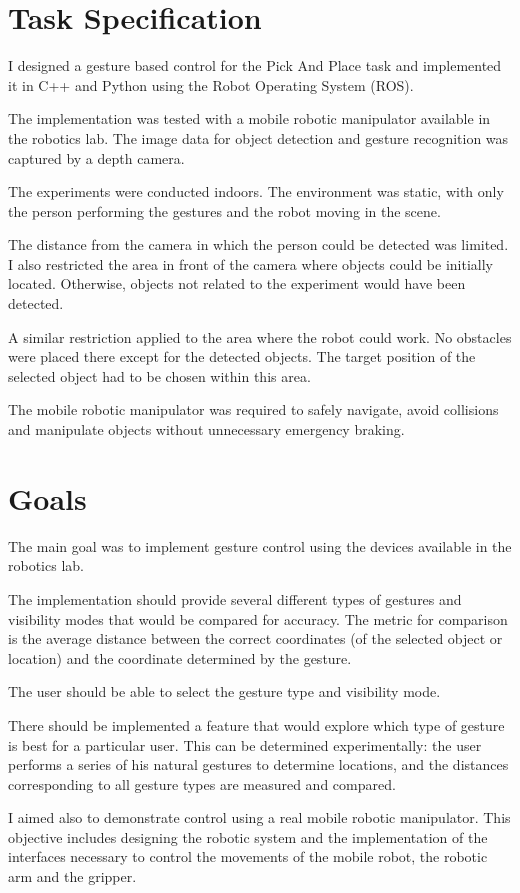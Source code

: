 \section{Task Specification}
I designed a gesture based control for the Pick And Place task and implemented it in C++ and Python using the Robot Operating System (ROS).\par
The implementation was tested with a mobile robotic manipulator available in the robotics lab. The image data for object detection and gesture recognition was captured by a depth camera.\par
The experiments were conducted indoors. The environment was static, with only the person performing the gestures and the robot moving in the scene.\par
The distance from the camera in which the person could be detected was limited. I also restricted the area in front of the camera where objects could be initially located. Otherwise, objects not related to the experiment would have been detected.\par
A similar restriction applied to the area where the robot could work. No obstacles were placed there except for the detected objects. The target position of the selected object had to be chosen within this area.\par
The mobile robotic manipulator was required to safely navigate, avoid collisions and manipulate objects without unnecessary emergency braking.\par

\section{Goals}
The main goal was to implement gesture control using the devices available in the robotics lab.\par
The implementation should provide several different types of gestures and visibility modes that would be compared for accuracy. The metric for comparison is the average distance between the correct coordinates (of the selected object or location) and the coordinate determined by the gesture.\par
The user should be able to select the gesture type and visibility mode.\par
There should be implemented a feature that would explore which type of gesture is best for a particular user. This can be determined  experimentally: the user performs a series of his natural gestures to determine locations, and the distances corresponding to all gesture types are measured and compared.\par
I aimed also to demonstrate control using a real mobile robotic manipulator. This objective includes designing the robotic system and the implementation of the interfaces necessary to control the movements of the mobile robot, the robotic arm and the gripper.\par

